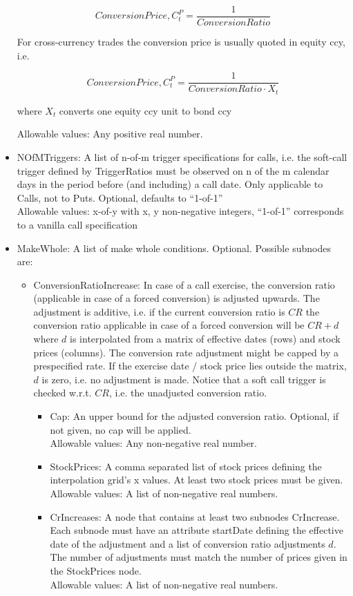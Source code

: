 \begin{itemize}
$$
Conversion Price, C^P_t = \frac{1}{ConversionRatio}
$$
  
For cross-currency trades the conversion price is usually quoted in equity ccy, i.e.  
  
$$
Conversion Price, C^P_t = \frac{1}{ConversionRatio \cdot X_t}
$$  
  
where $X_t$ converts one equity ccy unit to bond ccy  
  
  Allowable values: Any positive real number.

\item NOfMTriggers: A list of n-of-m trigger specifications for calls, i.e. the soft-call trigger defined by
  TriggerRatios must be observed on n of the m calendar days in the period before (and including) a call date. Only applicable
  to Calls, not to Puts. Optional, defaults to ``1-of-1'' \\
  Allowable values: x-of-y with x, y non-negative integers, ``1-of-1'' corresponds to a vanilla call specification

\item MakeWhole: A list of make whole conditions. Optional. Possible subnodes are:
  \begin{itemize}
    \item ConversionRatioIncrease: In case of a call exercise, the conversion ratio (applicable in case of a forced
      conversion) is adjusted upwards. The adjustment is additive, i.e. if the current conversion ratio is $CR$ the
      conversion ratio applicable in case of a forced conversion will be $CR+d$ where $d$ is interpolated from a matrix
      of effective dates (rows) and stock prices (columns). The conversion rate adjustment might be capped by a
      prespecified rate. If the exercise date / stock price lies outside the matrix, $d$ is zero, i.e. no adjustment is
      made. Notice that a soft call trigger is checked w.r.t. $CR$, i.e. the unadjusted conversion ratio.
      \begin{itemize}
      \item Cap: An upper bound for the adjusted conversion ratio. Optional, if not given, no cap will be applied.\\
        Allowable values: Any non-negative real number.
      \item StockPrices: A comma separated list of stock prices defining the interpolation grid's x values. At least two
        stock prices must be given.\\
        Allowable values: A list of non-negative real numbers.
      \item CrIncreases: A node that contains at least two subnodes CrIncrease. Each subnode must have an attribute
        startDate defining the effective date of the adjustment and a list of conversion ratio adjustments $d$. The
        number of adjustments must match the number of prices given in the StockPrices node. \\
        Allowable values: A list of non-negative real numbers.
      \end{itemize}
  \end{itemize}

\end{itemize}

